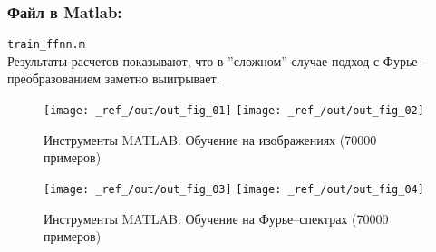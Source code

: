 \documentclass[12pt,a4paper]{article}
\begin{document}
\subsubsection*{Файл в Matlab:}
\verb|train_ffnn.m|\\[12pt]

\noindent
Результаты расчетов показывают, что в ''сложном'' случае подход с Фурье -- преобразованием заметно выигрывает.

\begin{figure}[H]
	\centering
	\texttt{[image: \_ref\_/out/out\_fig\_01]}	
	\texttt{[image: \_ref\_/out/out\_fig\_02]}
	\caption{Инструменты MATLAB. Обучение на изображениях (70000 примеров)}
	\label{fig:res01}
\end{figure}

\begin{figure}[H]
	\centering
	\texttt{[image: \_ref\_/out/out\_fig\_03]}	
	\texttt{[image: \_ref\_/out/out\_fig\_04]}	
	\caption{Инструменты MATLAB. Обучение на Фурье--спектрах (70000 примеров)}
	\label{fig:res02}
\end{figure}
\end{document}
